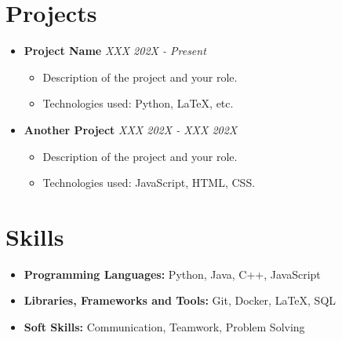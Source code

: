 \documentclass[10pt]{article}
\newcommand{\sectionline}{\noindent\makebox[\linewidth]{\rule{\textwidth}{0.5pt}}}
\newcommand{\resumesection}[1]{\vspace{-0.5em}\section*{\textbf{#1}}\vspace{-1.5em}\sectionline\vspace{0.0em}}
\newenvironment{resumeitemize}
{\begin{itemize}[leftmargin=*, noitemsep, topsep=0pt, label={}]} %
{\end{itemize}}
\newenvironment{subitemize}
{\begin{itemize}[leftmargin=*, noitemsep, topsep=0pt, label=\textbullet]} %
{\end{itemize}}
\begin{document}
\resumesection{Projects}
\begin{resumeitemize}
    \item \textbf{Project Name} \hfill \textit{XXX 202X - Present} 
    \begin{subitemize}
        \item Description of the project and your role.
        \item Technologies used: Python, LaTeX, etc.
    \end{subitemize}

    \vspace{0.1in}
    
    \item \textbf{Another Project} \hfill \textit{XXX 202X - XXX 202X}
    \begin{subitemize}
        \item Description of the project and your role.
        \item Technologies used: JavaScript, HTML, CSS.
    \end{subitemize}

    
\end{resumeitemize}

\resumesection{Skills}
\begin{resumeitemize}
    \item \textbf{Programming Languages:} Python, Java, C++, JavaScript
    \item \textbf{Libraries, Frameworks and Tools:} Git, Docker, LaTeX, SQL
    \item \textbf{Soft Skills:} Communication, Teamwork, Problem Solving
\end{resumeitemize}
\end{document}
